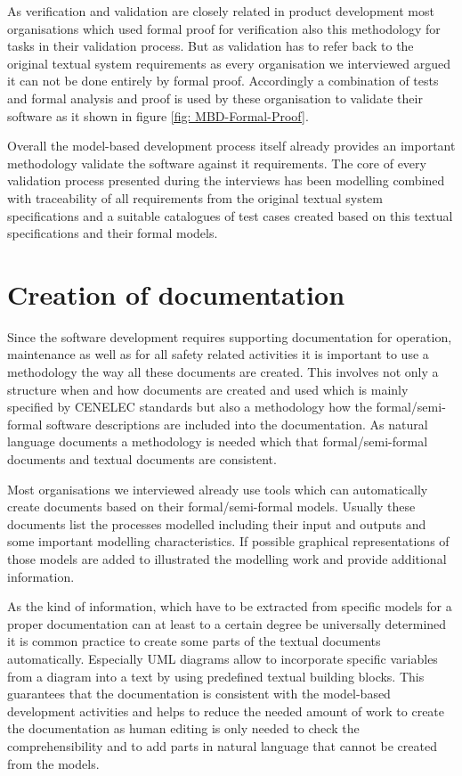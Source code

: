 \documentclass{./template/openetcs_report}
\begin{document}
As verification and validation are closely related in product development most organisations which used formal proof for verification also this methodology for tasks in their validation process. But as validation has to refer back to the original textual system requirements as every organisation we interviewed argued it can not be done entirely by formal proof. Accordingly a combination of tests and formal analysis and proof is used by these organisation to validate their software as it shown in figure \ref{fig: MBD-Formal-Proof}. 

Overall the model-based development process itself already provides an important methodology validate the software against it requirements. The core of every validation process presented during the interviews has been modelling combined with traceability of all requirements from the original textual system specifications and a suitable catalogues of test cases created based on this textual specifications and their formal models.

\section{Creation of documentation}

Since the software development requires supporting documentation for operation, maintenance as well as for all safety related activities it is important to use a methodology the way all these documents are created. This involves not only a structure when and how documents are created and used which is mainly specified by CENELEC standards but also a methodology how the formal/semi-formal software descriptions are included into the documentation. As natural language documents a methodology is needed which that formal/semi-formal documents and textual documents are consistent.

Most organisations we interviewed already use tools which can automatically create documents based on their formal/semi-formal models. Usually these documents list the processes modelled including their input and outputs and some important modelling characteristics. If possible graphical representations of those models are added to illustrated the modelling work and provide additional information.

As the kind of information, which have to be extracted from specific models for a proper documentation can at least to a certain degree be universally determined it is common practice to 
create some parts of the textual documents automatically. Especially UML diagrams allow to incorporate specific variables from a diagram into a text by using predefined textual building blocks. This guarantees that the documentation is consistent with the model-based development activities and helps to reduce the needed amount of work to create the documentation as human editing is only needed to check the comprehensibility and to add parts in natural language that cannot be created from the models.
\end{document}
